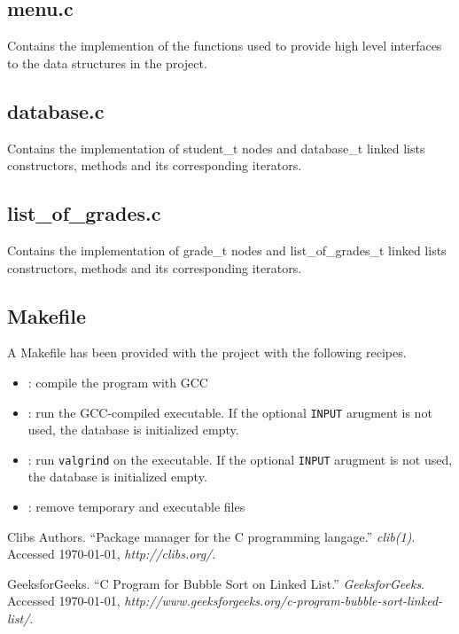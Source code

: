 \documentclass[usletter, 12pt]{article}
\begin{document}
        \subsection{menu.c} Contains the implemention of the functions used to
        provide high level interfaces to the data structures in the project.

        \subsection{database.c} Contains the implementation of student\_t nodes
        and database\_t linked lists constructors, methods and its
        corresponding iterators.

        \subsection{list\_of\_grades.c} Contains the implementation of grade\_t
        nodes and list\_of\_grades\_t linked lists constructors, methods and
        its corresponding iterators.

        \subsection{Makefile} A Makefile has been provided with the project
        with the following recipes.
        \begin{itemize}

            \item {}: compile the program with GCC

            \item {}: run the GCC-compiled
            executable. If the optional \texttt{INPUT} arugment is not used,
            the database is initialized empty.

            \item {}: run \texttt{valgrind}
            on the executable. If the optional \texttt{INPUT} arugment is not
            used, the database is initialized empty.

            \item {}: remove temporary and executable files 

        \end{itemize}

    \begin{thebibliography}{9}
         Clibs Authors. ``Package manager for the C programming
        langage.'' \textit{clib(1)}. Accessed \today,
        \textit{http://clibs.org/}.

         GeeksforGeeks. ``C Program for Bubble Sort on Linked
        List.'' \textit{GeeksforGeeks}. Accessed \today,
        \textit{http://www.geeksforgeeks.org/c-program-bubble-sort-linked-
        list/}.
    \end{thebibliography}
\end{document}
